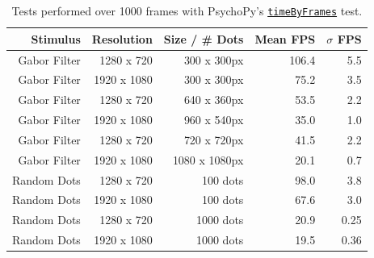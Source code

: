 \begin{table}
\caption{Tests performed over 1000 frames with PsychoPy's \href{https://github.com/psychopy/psychopy/blob/3.1/psychopy/demos/coder/timing/timeByFrames.py}{\texttt{timeByFrames}} test.}
    \begin{tabular}{rrr|rr}
        \toprule
        \textbf{Stimulus} & \textbf{Resolution} & \textbf{Size / \# Dots}& \textbf{Mean FPS} & \textbf{$\sigma$ FPS} \\
        \midrule 
        Gabor Filter & 1280 x 720  & 300 x 300px & 106.4 & 5.5 \\
        Gabor Filter & 1920 x 1080 & 300 x 300px & 75.2 & 3.5\\
        Gabor Filter & 1280 x 720 & 640 x 360px & 53.5 & 2.2\\ 
        Gabor Filter & 1920 x 1080 & 960 x 540px & 35.0 & 1.0 \\
        Gabor Filter & 1280 x 720 & 720 x 720px & 41.5 & 2.2 \\
        Gabor Filter & 1920 x 1080 & 1080 x 1080px & 20.1 & 0.7 \\
        Random Dots & 1280 x 720 & 100 dots & 98.0 & 3.8 \\
        Random Dots & 1920 x 1080 & 100 dots & 67.6 & 3.0 \\
        Random Dots & 1280 x 720 & 1000 dots & 20.9 & 0.25 \\
        Random Dots & 1920 x 1080 & 1000 dots & 19.5 & 0.36 \\
        \bottomrule
    \end{tabular}
    \label{tab:fpstests}
\end{table}

